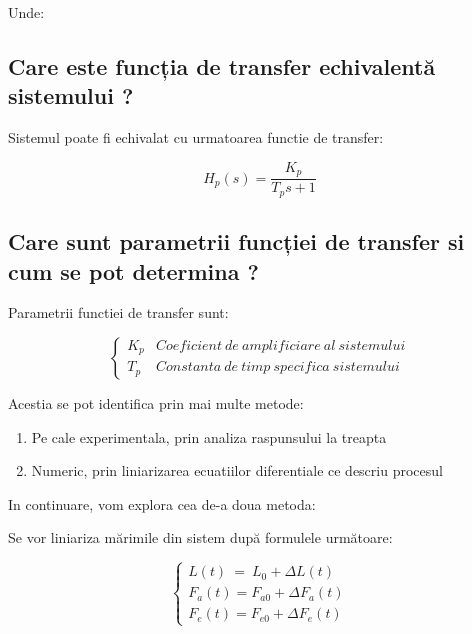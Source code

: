 \documentclass[12pt,english]{article}
\begin{document}
Unde:


\subsection {Care este funcția de transfer echivalentă sistemului ?}
Sistemul poate fi echivalat cu urmatoarea functie de transfer:
\begin{center}
  \begin{equation*}
  H_{p}( s) =\dfrac{K_{p}}{T_{p} s+1}
  \end{equation*}
\end{center}

\subsection {Care sunt parametrii funcției de transfer si cum se pot determina ?}
Parametrii functiei de transfer sunt:
\begin{center}
  \begin{equation*}
  \begin{cases}
  K_{p} & Coeficient\ de\ amplificiare\ al\ sistemului\\
  T_{p} & Constanta\ de\ timp\ specifica\ sistemului
  \end{cases}
  \end{equation*}
\end{center}

Acestia se pot identifica prin mai multe metode:
\begin{enumerate}
  \item Pe cale experimentala, prin analiza raspunsului la treapta
  \item Numeric, prin liniarizarea ecuatiilor diferentiale ce descriu procesul
\end{enumerate}

In continuare, vom explora cea de-a doua metoda:


Se vor liniariza mărimile din sistem după formulele următoare:
\begin{center}
  \begin{equation*}
  \begin{cases}
  L( t) \ =\ L_{0} +\Delta L( t)\\
  F_{a}( t) =F_{a0} +\Delta F_{a}( t)\\
  F_{e}( t) =F_{e0} +\Delta F_{e}( t)
  \end{cases}
  \end{equation*}
\end{center}
\end{document}
